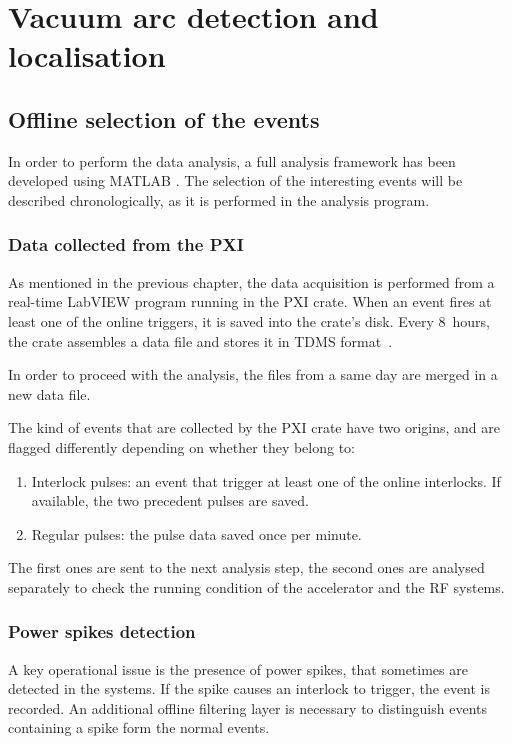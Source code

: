 \chapter[Vacuum arc detection and  localisation]{Vacuum arc detection and  localisation}

\section[Offline selection of the events]{Offline selection of the events}

In order to perform the data analysis, a full analysis framework has been developed using MATLAB \cite{MW:matlab}. The selection of the interesting events will be described chronologically, as it is performed in the analysis program.

\subsection[Data collected from the PXI]{Data collected from the PXI}

As mentioned in the previous chapter, the data acquisition is performed from a real-time LabVIEW program running in the PXI crate. When an event fires at least one of the online triggers, it is saved into the crate's disk. Every 8~hours, the crate assembles a data file and stores it in TDMS format~\cite{NI:TDMS}. 

In order to proceed with the analysis, the files from a same day are merged in a new data file.

The kind of events that are collected by the PXI crate have two origins, and are flagged differently depending on whether they belong to:
\begin{enumerate}
\item Interlock pulses: an event that trigger at least one of the online interlocks. If available, the two precedent pulses are saved.
\item Regular pulses: the pulse data saved once per minute.
\end{enumerate}
The first ones are sent to the next analysis step, the second ones are analysed separately to check the running condition of the accelerator and the RF systems.

\subsection[Power spikes detection]{Power spikes detection}

A key operational issue is the presence of power spikes, that sometimes are detected in the systems. If the spike causes an interlock to trigger, the event is recorded. An additional offline filtering layer is necessary to distinguish events containing a spike form the normal events.

